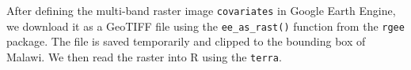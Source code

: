 \documentclass[
  letterpaper,
]{krantz}
\newenvironment{Shaded}{\begin{snugshade}}{\end{snugshade}}
\newcommand{\CommentTok}[1]{\textcolor[rgb]{0.56,0.35,0.01}{\textit{#1}}}
\newcommand{\DecValTok}[1]{\textcolor[rgb]{0.00,0.00,0.81}{#1}}
\newcommand{\FunctionTok}[1]{\textcolor[rgb]{0.13,0.29,0.53}{\textbf{#1}}}
\newcommand{\NormalTok}[1]{#1}
\newcommand{\OtherTok}[1]{\textcolor[rgb]{0.56,0.35,0.01}{#1}}
\newcommand{\SpecialCharTok}[1]{\textcolor[rgb]{0.81,0.36,0.00}{\textbf{#1}}}
\newcommand{\StringTok}[1]{\textcolor[rgb]{0.31,0.60,0.02}{#1}}
\begin{document}
\begin{Shaded}
\end{Shaded}

After defining the multi-band raster image \texttt{covariates} in Google
Earth Engine, we download it as a GeoTIFF file using the
\texttt{ee\_as\_rast()} function from the \texttt{rgee} package. The
file is saved temporarily and clipped to the bounding box of Malawi. We
then read the raster into R using the \texttt{terra}.
\end{document}
